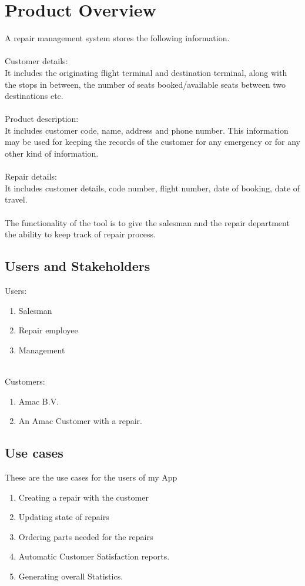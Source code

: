 \documentclass{article}
\begin{document}
\section{Product Overview}

A repair management system stores the following information.\\
\\
Customer details:\\
It includes the originating flight terminal and destination terminal, along with the stops in between, the number of seats booked/available seats between two destinations etc.\\
\\
Product description:\\
It includes customer code, name, address and phone number. This information may be used for keeping the records of the customer for any emergency or for any other kind of information.\\
\\
Repair details:\\
It includes customer details, code number, flight number, date of booking, date of travel.\\
\\
The functionality of the tool is to give the salesman and the repair department the ability to keep track of repair process. 

\subsection {Users and Stakeholders}
Users:
\begin{enumerate}
    \item Salesman
    \item Repair employee
    \item Management
\end{enumerate}
\\
Customers:
\begin{enumerate}
    \item Amac B.V.
    \item An Amac Customer with a repair.
\end{enumerate}

\subsection{Use cases}
These are the use cases for the users of my App
\begin{enumerate}
    \item Creating a repair with the customer
    \item Updating state of repairs
    \item Ordering parts needed for the repairs
    \item Automatic Customer Satisfaction reports.
    \item Generating overall Statistics.
\end{enumerate}
\end{document}

